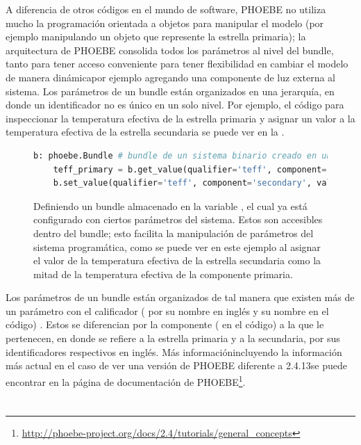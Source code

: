 A diferencia de otros códigos en el mundo de software, PHOEBE no utiliza mucho
la programación orientada a objetos para manipular el modelo (por ejemplo
manipulando un objeto que represente la estrella primaria); la arquitectura de
PHOEBE consolida todos los parámetros al nivel del bundle, tanto para tener
acceso conveniente para tener flexibilidad en cambiar el modelo de manera
dinámica\textemdash por ejemplo agregando una componente de luz externa al
sistema. Los parámetros de un bundle están organizados en una jerarquía, en
donde un identificador no es único en un solo nivel. Por ejemplo, el código para
inspeccionar la temperatura efectiva de la estrella primaria y asignar un valor
a la temperatura efectiva de la estrella secundaria se puede ver en la
.

\begin{figure}[!ht]
	\begin{lstlisting}[language=Python, autogobble]
	b: phoebe.Bundle # bundle de un sistema binario creado en un codigo anterior
	teff_primary = b.get_value(qualifier='teff', component='primary')
	b.set_value(qualifier='teff', component='secondary', value=teff_primary/2)
	\end{lstlisting}
	\caption{Definiendo un bundle almacenado en la variable , el cual ya
	está configurado con ciertos parámetros del sistema. Estos son accesibles
	dentro del bundle; esto facilita la manipulación de parámetros del sistema
	programática, como se puede ver en este ejemplo al asignar el valor de la
	temperatura efectiva de la estrella secundaria como la mitad de la
	temperatura efectiva de la componente primaria.}
	\label{codigoAsignandoTeffPhoebe}
\end{figure}

Los parámetros de un bundle están organizados de tal manera que existen más de
un parámetro con el calificador ( por su nombre en inglés y su
nombre en el código) . Estos se diferencian por la componente
( en el código) a la que le pertenecen, en donde 
se refiere a la estrella primaria y  a la secundaria, por sus
identificadores respectivos en inglés. Más información\textemdash incluyendo la
información más actual en el caso de ver una versión de PHOEBE diferente a
2.4.13\textemdash se puede encontrar en la página de documentación de
PHOEBE\footnote{\url{http://phoebe-project.org/docs/2.4/tutorials/general_concepts}}.

\section{}

